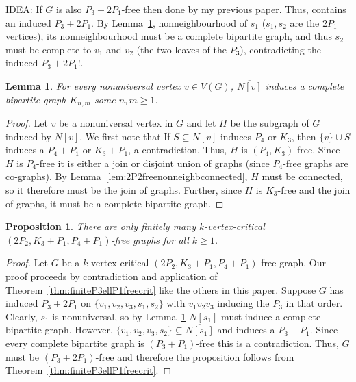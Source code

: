 \documentclass[11pt]{article}
\newtheorem{lemma}[theorem]{Lemma}
\newtheorem{proposition}[theorem]{Proposition}
\theoremstyle{definition}
\newcommand{\noneighbs}{\overline{N[v]}}
\begin{document}
IDEA: If $G$ is also $P_3+2P_1$-free then done by my previous paper. Thus, contains an induced $P_3+2P_1$. By Lemma~\ref{lem:completebipartite}, nonneighbourhood of $s_1$ ($s_1,s_2$ are the $2P_1$ vertices), its nonneighbourhood must be a complete bipartite graph, and thus $s_2$ must be complete to $v_1$ and $v_2$ (the two leaves of the $P_3$), contradicting the induced $P_3+2P_1$!. 
\begin{lemma}\label{lem:completebipartite}
For every nonuniversal vertex $v\in V(G)$,  $\noneighbs$ induces a complete bipartite graph $K_{n,m}$ some $n,m\ge 1$.
\end{lemma}
\begin{proof}
Let $v$ be a nonuniversal vertex in $G$ and let $H$ be the subgraph of $G$ induced by $\noneighbs$. We first note that If $S\subseteq\noneighbs$ induces $P_4$ or $K_3$, then $\{v\}\cup S$ induces a $P_4+P_1$ or $K_3+P_1$, a contradiction. Thus, $H$ is $(P_4, K_3)$-free. Since $H$ is $P_4$-free it is either a join or disjoint union of graphs (since $P_4$-free graphs are co-graphs). By Lemma~\ref{lem:2P2freenonneighbconnected}, $H$ must be connected, so it therefore must be the join of graphs. Further, since $H$ is $K_3$-free and the join of graphs, it must be a complete bipartite graph. 
\end{proof}

\begin{proposition}\label{prop:2P2K3P1P4P1freeisP32P1free}
There are only finitely many $k$-vertex-critical $(2P_2,K_3+P_1,P_4+P_1)$-free graphs for all $k\ge 1$.
\end{proposition}
\begin{proof}
Let $G$ be a $k$-vertex-critical $(2P_2,K_3+P_1,P_4+P_1)$-free graph. Our proof proceeds by contradiction and application of Theorem~\ref{thm:finiteP3ellP1freecrit} like the others in this paper. Suppose $G$ has induced $P_3+2P_1$ on $\{v_1,v_2,v_3,s_1,s_2\}$ with $v_1v_2v_3$ inducing the $P_3$ in that order. Clearly, $s_1$ is nonuniversal, so by Lemma~\ref{lem:completebipartite} $\overline{N[s_1]}$ must induce a complete bipartite graph. However, $\{v_1,v_2,v_3,s_2\}\subseteq\overline{N[s_1]}$ and induces a $P_3+P_1$. Since every complete bipartite graph is $(P_3+P_1)$-free this is a contradiction. Thus, $G$ must be $(P_3+2P_1)$-free and therefore the proposition follows from Theorem~\ref{thm:finiteP3ellP1freecrit}.
\end{proof}


%
%



\end{document}
